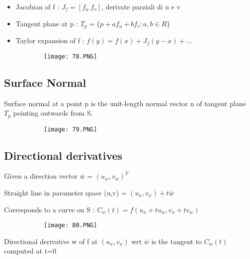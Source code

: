 \documentclass{article}
\begin{document}
\begin{itemize}
    \item Jacobian of f : $J_f = [f_u.f_v]$, derivate parziali di u e v
    \item Tangent plane at p : $T_p = \{p + af_u + bf_v : a,b \in R\}$
    \item Taylor expansion of f : $f(y) = f(x) + J_f(y-x) + ...$
\end{itemize}


    \begin{figure}[ht!]
  \centering
  \begin{subfigure}[b]{0.2\linewidth}
    \texttt{[image: 78.PNG]}
  \end{subfigure}
\end{figure}


\subsection{Surface Normal}

Surface normal at a point p is the unit-length normal vector n of tangent plane $T_p$ pointing outwards from S.

    \begin{figure}[ht!]
  \centering
  \begin{subfigure}[b]{0.6\linewidth}
    \texttt{[image: 79.PNG]}
  \end{subfigure}
\end{figure}

\vspace{30mm}

\subsection{Directional derivatives}

Given a direction vector $\bar w$ = $(u_w,v_w)^T$

Straight line in parameter space (u,v) = $(u_x,v_x) + t\bar w$

Corresponds to a curve on S : $C_w(t) = f(u_x + tu_w, v_x + tv_w)$

    \begin{figure}[ht!]
  \centering
  \begin{subfigure}[b]{0.3\linewidth}
    \texttt{[image: 80.PNG]}
  \end{subfigure}
\end{figure}

Directional derivative w of f at $(u_x,v_x)$ wrt $\bar w$ is the tangent to $C_w (t)$ computed at t=0
\end{document}
